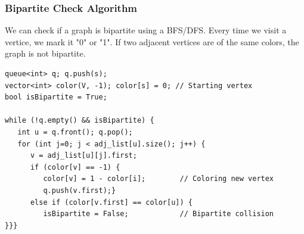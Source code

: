 \begin{frame}[fragile]
  \frametitle{Bipartite Check Algorithm}
  We can check if a graph is bipartite using a BFS/DFS. Every time we visit a vertice, we mark it "0" or "1". If two adjacent vertices are of the same colors, the graph is not bipartite.

  {\smaller
  \begin{exampleblock}{}
\begin{verbatim}
queue<int> q; q.push(s);
vector<int> color(V, -1); color[s] = 0; // Starting vertex
bool isBipartite = True;

while (!q.empty() && isBipartite) {
   int u = q.front(); q.pop();
   for (int j=0; j < adj_list[u].size(); j++) {
      v = adj_list[u][j].first;
      if (color[v] == -1) {
         color[v] = 1 - color[i];        // Coloring new vertex
         q.push(v.first);}
      else if (color[v.first] == color[u]) {
         isBipartite = False;            // Bipartite collision
}}}
\end{verbatim}
  \end{exampleblock}
  }
\end{frame}

